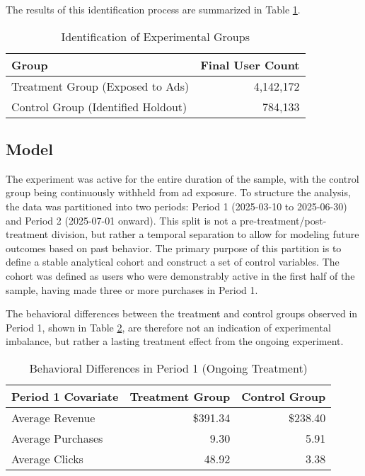 The results of this identification process are summarized in Table \ref{tab:holdout_identification}.

\begin{table}[htbp!]
\centering
\caption{Identification of Experimental Groups}
\label{tab:holdout_identification}
\begin{tabular}{lr}
\toprule
Group & Final User Count \\
\midrule
Treatment Group (Exposed to Ads) & 4,142,172 \\
Control Group (Identified Holdout) & 784,133 \\
\bottomrule
\end{tabular}
\end{table}

\subsection*{Model}

The experiment was active for the entire duration of the sample, with the control group being continuously withheld from ad exposure. To structure the analysis, the data was partitioned into two periods: Period 1 (2025-03-10 to 2025-06-30) and Period 2 (2025-07-01 onward). This split is not a pre-treatment/post-treatment division, but rather a temporal separation to allow for modeling future outcomes based on past behavior. The primary purpose of this partition is to define a stable analytical cohort and construct a set of control variables. The cohort was defined as users who were demonstrably active in the first half of the sample, having made three or more purchases in Period 1.

The behavioral differences between the treatment and control groups observed in Period 1, shown in Table \ref{tab:covariate_balance}, are therefore not an indication of experimental imbalance, but rather a lasting treatment effect from the ongoing experiment. 

\begin{table}[htbp!]
\centering
\caption{Behavioral Differences in Period 1 (Ongoing Treatment)}
\label{tab:covariate_balance}
\begin{tabular}{lrr}
\toprule
Period 1 Covariate & Treatment Group & Control Group \\
\midrule
Average Revenue & \$391.34 & \$238.40 \\
Average Purchases & 9.30 & 5.91 \\
Average Clicks & 48.92 & 3.38 \\
\bottomrule
\end{tabular}
\end{table}

